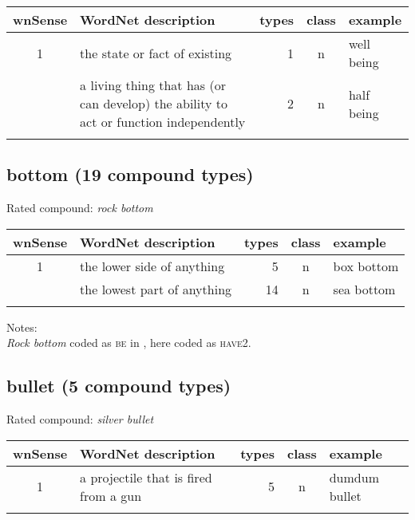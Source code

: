 \noindent
\begin{longtable}{c>{\raggedright\arraybackslash}p{5cm}rc>{\raggedright\arraybackslash}p{2cm}}\lsptoprule
{\small wnSense}&WordNet description&types&class&example\\\midrule
1&the state or fact of existing&1&n&well being\\\tablevspace
2&a living thing that has (or can develop) the ability to act or function independently&2&n&half being\\\lspbottomrule
\end{longtable}
\subsection{bottom    (19 compound types)}
Rated compound: \emph{rock bottom}
\vspace*{-.3cm}

\noindent
\begin{longtable}{c>{\raggedright\arraybackslash}p{5cm}rc>{\raggedright\arraybackslash}p{2cm}}\lsptoprule
{\small wnSense}&WordNet description&types&class&example\\\midrule
1&the lower side of anything&5&n&box bottom\\\tablevspace
2&the lowest part of anything&14&n&sea bottom\\\lspbottomrule
\end{longtable}
\vspace*{-0.3cm}

\noindent
Notes:\\
\emph{Rock bottom} coded as \textsc{be} in \citet{BellandSchaefer:2013}, here coded as \textsc{have2}.

\vspace*{-0.3cm}
\subsection{bullet    (5 compound types)}
Rated compound: \emph{silver bullet}


\noindent
\begin{longtable}{c>{\raggedright\arraybackslash}p{5cm}rc>{\raggedright\arraybackslash}p{2cm}}\lsptoprule
{\small wnSense}&WordNet description&types&class&example\\\midrule
1&a projectile that is fired from a gun&5&n&dumdum bullet\\\lspbottomrule
\end{longtable}
\vspace*{-0.8cm}
